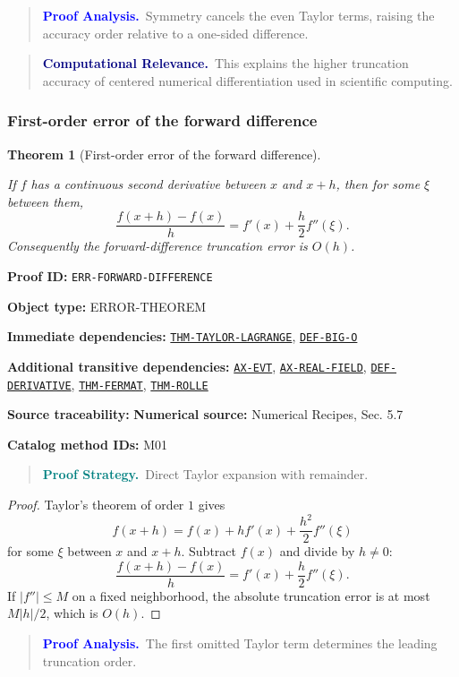 \documentclass[10pt]{article}
\newcommand{\pidraw}[1]{\begingroup\urlstyle{tt}\nolinkurl{#1}\endgroup}
\newcommand{\pidref}[1]{\hyperref[prf:#1]{\pidraw{#1}}}
\newtheorem{theorem}{Theorem}[section]
\theoremstyle{definition}
\theoremstyle{remark}
\newenvironment{proofstrategy}
{\begin{quote}\small\noindent\textbf{\textcolor{teal}{Proof Strategy.}}\ }
{\end{quote}}
\newenvironment{proofanalysis}
{\begin{quote}\small\noindent\textbf{\textcolor{blue}{Proof Analysis.}}\ }
{\end{quote}}
\newenvironment{computationalrelevance}
{\begin{quote}\small\noindent\textbf{\textcolor{navy}{Computational Relevance.}}\ }
{\end{quote}}
\newcommand{\meta}[2]{\noindent\textbf{#1:} #2\par}
\begin{document}
\begin{proofanalysis}Symmetry cancels the even Taylor terms, raising the accuracy order relative to a one-sided difference.\end{proofanalysis}

\begin{computationalrelevance}This explains the higher truncation accuracy of centered numerical differentiation used in scientific computing.\end{computationalrelevance}

\subsubsection{First-order error of the forward difference}

\begin{theorem}[First-order error of the forward difference]\label{prf:ERR-FORWARD-DIFFERENCE}

If $f$ has a continuous second derivative between $x$ and $x+h$, then for some $\xi$ between them,
\[
\frac{f(x+h)-f(x)}{h}
=
f'(x)+\frac{h}{2}f''(\xi).
\]
Consequently the forward-difference truncation error is $O(h)$.

\end{theorem}

\meta{Proof ID}{\pidraw{ERR-FORWARD-DIFFERENCE}}
\meta{Object type}{ERROR-THEOREM}
\meta{Immediate dependencies}{\pidref{THM-TAYLOR-LAGRANGE}, \pidref{DEF-BIG-O}}
\meta{Additional transitive dependencies}{\pidref{AX-EVT}, \pidref{AX-REAL-FIELD}, \pidref{DEF-DERIVATIVE}, \pidref{THM-FERMAT}, \pidref{THM-ROLLE}}
\meta{Source traceability}{\textbf{Numerical source:} Numerical Recipes, Sec. 5.7}
\meta{Catalog method IDs}{M01}

\begin{proofstrategy}Direct Taylor expansion with remainder.\end{proofstrategy}

\begin{proof}

Taylor's theorem of order $1$ gives
\[
f(x+h)=f(x)+hf'(x)+\frac{h^2}{2}f''(\xi)
\]
for some $\xi$ between $x$ and $x+h$. Subtract $f(x)$ and divide by $h\ne0$:
\[
\frac{f(x+h)-f(x)}{h}
=
f'(x)+\frac{h}{2}f''(\xi).
\]
If $|f''|\le M$ on a fixed neighborhood, the absolute truncation error is at most
$M|h|/2$, which is $O(h)$.

\end{proof}

\begin{proofanalysis}The first omitted Taylor term determines the leading truncation order.\end{proofanalysis}
\end{document}
